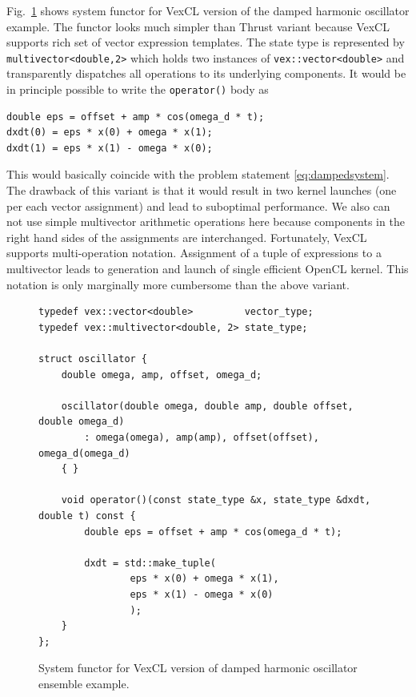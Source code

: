\documentclass[1p]{elsarticle}
\newcommand{\code}[1]{\lstinline|#1|}
\newcommand{\figref}[1]{Fig.~\ref{#1}}
\begin{document}
\figref{code:vexcl:damped} shows system functor for VexCL version of the damped
harmonic oscillator example. The functor looks much simpler than Thrust variant
because VexCL supports rich set of vector expression templates. The
state type is represented by \code{multivector<double,2>} which holds two
instances of \code{vex::vector<double>} and transparently dispatches all
operations to its underlying components. It would be in principle possible to
write the \code{operator()} body as
\begin{lstlisting}[frame=leftline]
double eps = offset + amp * cos(omega_d * t);
dxdt(0) = eps * x(0) + omega * x(1);
dxdt(1) = eps * x(1) - omega * x(0);
\end{lstlisting}
This would basically coincide with the problem statement
\eqref{eq:dampedsystem}. The drawback of this variant is that it would result
in two kernel launches (one per each vector assignment) and lead to suboptimal
performance. We also can not use simple multivector arithmetic operations here
because components in the right hand sides of the assignments are interchanged.
Fortunately, VexCL supports multi-operation notation. Assignment of a tuple of
expressions to a multivector leads to generation and launch of single efficient
OpenCL kernel. This notation is only marginally more cumbersome than the above
variant.

\begin{figure}[p]
\begin{lstlisting}
typedef vex::vector<double>         vector_type;
typedef vex::multivector<double, 2> state_type;

struct oscillator {
    double omega, amp, offset, omega_d;

    oscillator(double omega, double amp, double offset, double omega_d)
        : omega(omega), amp(amp), offset(offset), omega_d(omega_d)
    { }

    void operator()(const state_type &x, state_type &dxdt, double t) const {
        double eps = offset + amp * cos(omega_d * t);

        dxdt = std::make_tuple(
                eps * x(0) + omega * x(1),
                eps * x(1) - omega * x(0)
                );
    }
};
\end{lstlisting}
\caption{System functor for VexCL version of damped harmonic oscillator
ensemble example.}
\label{code:vexcl:damped}
\end{figure}
\end{document}
